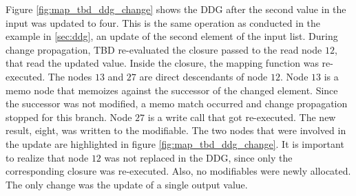 Figure \ref{fig:map_tbd_ddg_change} shows the DDG after the second value in the input was updated to four. This is the same operation as conducted in the example in \ref{sec:ddg}, an update of the second element of the input list. During change propagation, TBD re-evaluated the closure passed to the read node $12$, that read the updated value. Inside the closure, the mapping function was re-executed. The nodes $13$ and $27$ are direct descendants of node $12$. Node $13$ is a memo node that memoizes against the successor of the changed element. Since the successor was not modified, a memo match occurred and change propagation stopped for this branch. Node $27$ is a write call that got re-executed. The new result, eight, was written to the modifiable. The two nodes that were involved in the update are highlighted in figure \ref{fig:map_tbd_ddg_change}. It is important to realize that node $12$ was not replaced in the DDG, since only the corresponding closure was re-executed. Also, no modifiables were newly allocated. The only change was the update of a single output value. 


